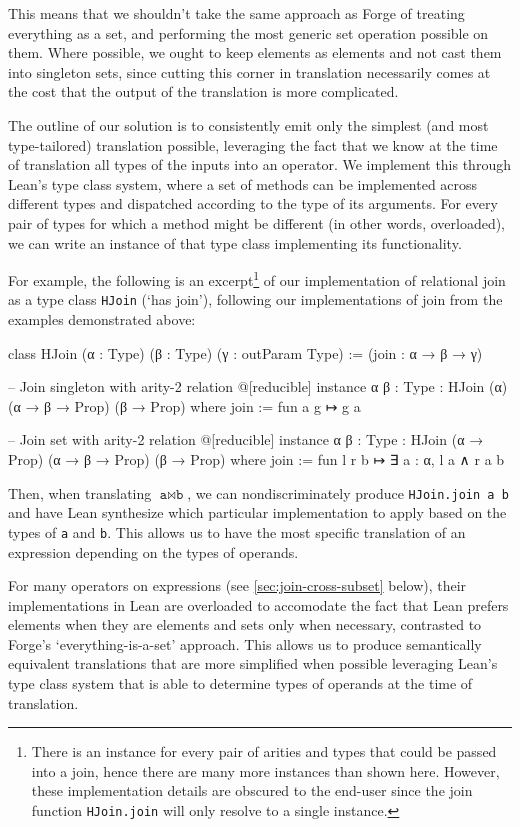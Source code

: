 This means that we shouldn't take the same approach as Forge of treating everything as a set, and performing the most generic set operation possible on them. Where possible, we ought to keep elements as elements and not cast them into singleton sets, since cutting this corner in translation necessarily comes at the cost that the output of the translation is more complicated. 

The outline of our solution is to consistently emit only the simplest (and most type-tailored) translation possible, leveraging the fact that we know at the time of translation all types of the inputs into an operator. We implement this through Lean's type class system, where a set of methods can be implemented across different types and dispatched according to the type of its arguments. For every pair of types for which a method might be different (in other words, overloaded), we can write an instance of that type class implementing its functionality. 

For example, the following is an excerpt\footnote{There is an instance for every pair of arities and types that could be passed into a join, hence there are many more instances than shown here. However, these implementation details are obscured to the end-user since the join function \texttt{HJoin.join} will only resolve to a single instance.} of our implementation of relational join as a type class \texttt{HJoin} (`has join'), following our implementations of join from the examples demonstrated above: 

\begin{leanimpl*}
class HJoin (α : Type) (β : Type) (γ : outParam Type) :=
  (join : α → β → γ)

-- Join singleton with arity-2 relation
@[reducible] instance {α β : Type} : HJoin (α) (α → β → Prop) (β → Prop) where
  join := fun a g ↦ g a

-- Join set with arity-2 relation
@[reducible] instance {α β : Type} : HJoin (α → Prop) (α → β → Prop) (β → Prop) where
  join := fun l r b ↦ ∃ a : α, l a ∧ r a b
\end{leanimpl*}

Then, when translating $\texttt{a}\bowtie \texttt{b}$, we can nondiscriminately produce \texttt{HJoin.join a b} and have Lean synthesize which particular implementation to apply based on the types of \texttt{a} and \texttt{b}. This allows us to have the most specific translation of an expression depending on the types of operands. 

For many operators on expressions (see \cref{sec:join-cross-subset} below), their implementations in Lean are overloaded to accomodate the fact that Lean prefers elements when they are elements and sets only when necessary, contrasted to Forge's `everything-is-a-set' approach. This allows us to produce semantically equivalent translations that are more simplified when possible leveraging Lean's type class system that is able to determine types of operands at the time of translation. 

